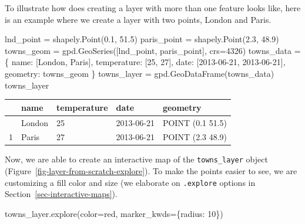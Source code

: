 \documentclass[
  letterpaper,
]{krantz}
\newenvironment{Shaded}{\begin{snugshade}}{\end{snugshade}}
\newcommand{\DecValTok}[1]{\textcolor[rgb]{0.68,0.00,0.00}{#1}}
\newcommand{\FloatTok}[1]{\textcolor[rgb]{0.68,0.00,0.00}{#1}}
\newcommand{\NormalTok}[1]{\textcolor[rgb]{0.00,0.23,0.31}{#1}}
\newcommand{\OperatorTok}[1]{\textcolor[rgb]{0.37,0.37,0.37}{#1}}
\newcommand{\StringTok}[1]{\textcolor[rgb]{0.13,0.47,0.30}{#1}}
\begin{document}
To illustrate how does creating a layer with more than one feature looks
like, here is an example where we create a layer with two points, London
and Paris.

\begin{Shaded}
\begin{Highlighting}[]
\NormalTok{lnd\_point }\OperatorTok{=}\NormalTok{ shapely.Point(}\FloatTok{0.1}\NormalTok{, }\FloatTok{51.5}\NormalTok{)}
\NormalTok{paris\_point }\OperatorTok{=}\NormalTok{ shapely.Point(}\FloatTok{2.3}\NormalTok{, }\FloatTok{48.9}\NormalTok{)}
\NormalTok{towns\_geom }\OperatorTok{=}\NormalTok{ gpd.GeoSeries([lnd\_point, paris\_point], crs}\OperatorTok{=}\DecValTok{4326}\NormalTok{)}
\NormalTok{towns\_data }\OperatorTok{=}\NormalTok{ \{}
  \StringTok{\textquotesingle{}name\textquotesingle{}}\NormalTok{: [}\StringTok{\textquotesingle{}London\textquotesingle{}}\NormalTok{, }\StringTok{\textquotesingle{}Paris\textquotesingle{}}\NormalTok{],}
  \StringTok{\textquotesingle{}temperature\textquotesingle{}}\NormalTok{: [}\DecValTok{25}\NormalTok{, }\DecValTok{27}\NormalTok{],}
  \StringTok{\textquotesingle{}date\textquotesingle{}}\NormalTok{: [}\StringTok{\textquotesingle{}2013{-}06{-}21\textquotesingle{}}\NormalTok{, }\StringTok{\textquotesingle{}2013{-}06{-}21\textquotesingle{}}\NormalTok{],}
  \StringTok{\textquotesingle{}geometry\textquotesingle{}}\NormalTok{: towns\_geom}
\NormalTok{\}}
\NormalTok{towns\_layer }\OperatorTok{=}\NormalTok{ gpd.GeoDataFrame(towns\_data)}
\NormalTok{towns\_layer}
\end{Highlighting}
\end{Shaded}

\begin{longtable}[]{@{}lllll@{}}
\toprule\noalign{}
& name & temperature & date & geometry \\
\midrule\noalign{}
\endhead
\bottomrule\noalign{}
\endlastfoot
0 & London & 25 & 2013-06-21 & POINT (0.1 51.5) \\
1 & Paris & 27 & 2013-06-21 & POINT (2.3 48.9) \\
\end{longtable}

Now, we are able to create an interactive map of the
\texttt{towns\_layer} object
(Figure~\ref{fig-layer-from-scratch-explore}). To make the points easier
to see, we are customizing a fill color and size (we elaborate on
\texttt{.explore} options in Section~\ref{sec-interactive-maps}).

\begin{Shaded}
\begin{Highlighting}[]
\NormalTok{towns\_layer.explore(color}\OperatorTok{=}\StringTok{\textquotesingle{}red\textquotesingle{}}\NormalTok{, marker\_kwds}\OperatorTok{=}\NormalTok{\{}\StringTok{\textquotesingle{}radius\textquotesingle{}}\NormalTok{: }\DecValTok{10}\NormalTok{\})}
\end{Highlighting}
\end{Shaded}
\end{document}
